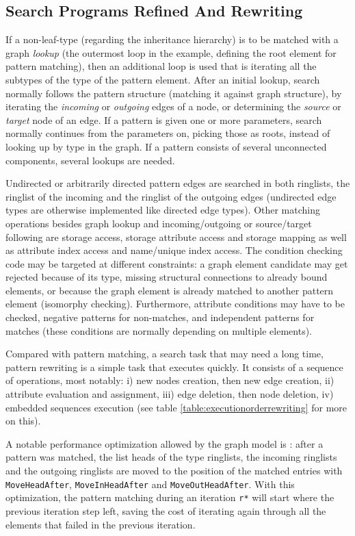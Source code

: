 \pagebreak

\subsection*{Search Programs Refined And Rewriting} %

If a non-leaf-type (regarding the inheritance hierarchy) is to be matched with a graph \emph{lookup} (the outermost loop in the example, defining the root element for pattern matching), then an additional loop is used that is iterating all the subtypes of the type of the pattern element.
After an initial lookup, search normally follows the pattern structure (matching it against graph structure), by iterating the \emph{incoming} or \emph{outgoing} edges of a node, or determining the \emph{source} or \emph{target} node of an edge.
If a pattern is given one or more parameters, search normally continues from the parameters on, picking those as roots, instead of looking up by type in the graph.
If a pattern consists of several unconnected components, several lookups are needed.

Undirected or arbitrarily directed pattern edges are searched in both ringlists, the ringlist of the incoming and the ringlist of the outgoing edges (undirected edge types are otherwise implemented like directed edge types).
Other matching operations besides graph lookup and incoming/outgoing or source/target following are storage access, storage attribute access and storage mapping as well as attribute index access and name/unique index access.
The condition checking code may be targeted at different constraints:
a graph element candidate may get rejected because of its type, missing structural connections to already bound elements, or because the graph element is already matched to another pattern element (isomorphy checking).
Furthermore, attribute conditions may have to be checked, negative patterns for non-matches, and independent patterns for matches (these conditions are normally depending on multiple elements).

Compared with pattern matching, a search task that may need a long time, pattern rewriting is a simple task that executes quickly. 
It consists of a sequence of operations, most notably: i) new nodes creation, then new edge creation, ii) attribute evaluation and assignment, iii) edge deletion, then node deletion, iv) embedded sequences execution (see table \ref{table:executionorderrewriting} for more on this).

A notable performance optimization allowed by the graph model is : after a pattern was matched, the list heads of the type ringlists, the incoming ringlists and the outgoing ringlists are moved to the position of the matched entries with \texttt{MoveHeadAfter}, \texttt{MoveInHeadAfter} and \texttt{MoveOutHeadAfter}.
With this optimization, the pattern matching during an iteration \texttt{r*} will start where the previous iteration step left, saving the cost of iterating again through all the elements that failed in the previous iteration.

